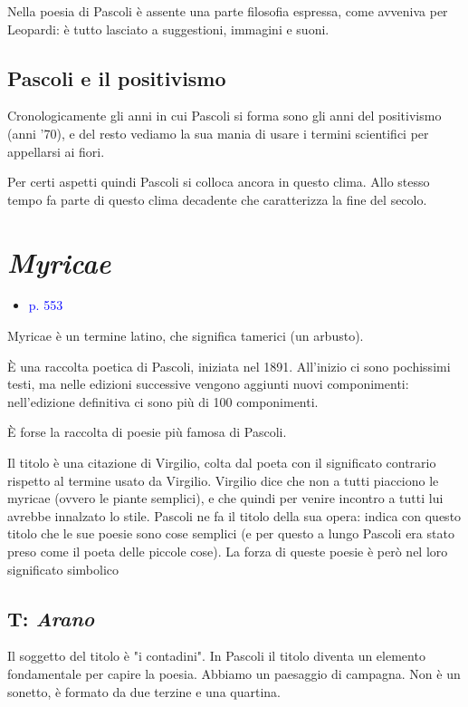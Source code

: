\documentclass[a4paper, twoside, titlepage]{book}
\newcommand{\elenco}[1]{%
\begin{itemize}
#1
\end{itemize}}
\renewcommand{\emph}[1]{\textcolor{blue}{#1}}
\begin{document}
Nella poesia di Pascoli è assente una parte filosofia espressa, come avveniva per Leopardi: è tutto lasciato a suggestioni, immagini e suoni.


\section{Pascoli e il positivismo}

Cronologicamente gli anni in cui Pascoli si forma sono gli anni del positivismo (anni '70), e del resto vediamo la sua mania di usare i termini scientifici per appellarsi ai fiori.

Per certi aspetti quindi Pascoli si colloca ancora in questo clima. Allo stesso tempo fa parte di questo clima decadente che caratterizza la fine del secolo.

\chapter{\textit{Myricae}}
\elenco{\item \emph{p. 553}}

Myricae è un termine latino, che significa tamerici (un arbusto).

È una raccolta poetica di Pascoli, iniziata nel 1891. All'inizio ci sono pochissimi testi, ma nelle edizioni successive vengono aggiunti nuovi componimenti: nell'edizione definitiva ci sono più di 100 componimenti.

È forse la raccolta di poesie più famosa di Pascoli.

Il titolo è una citazione di Virgilio, colta dal poeta con il significato contrario rispetto al termine usato da Virgilio.
Virgilio dice che non a tutti piacciono le myricae (ovvero le piante semplici), e che quindi per venire incontro a tutti lui avrebbe innalzato lo stile.
Pascoli ne fa il titolo della sua opera: indica con questo titolo che le sue poesie sono cose semplici (e per questo a lungo Pascoli era stato preso come il poeta delle piccole cose). La forza di queste poesie è però nel loro significato simbolico

\section{T: \textit{Arano}}

Il soggetto del titolo è "i contadini". In Pascoli il titolo diventa un elemento fondamentale per capire la poesia.
Abbiamo un paesaggio di campagna.
Non è un sonetto, è formato da due terzine e una quartina.
\end{document}
